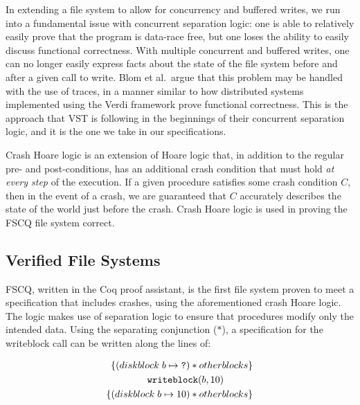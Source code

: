 In extending a file system to allow for concurrency and buffered writes, we run
into a fundamental issue with concurrent separation logic: one is able to
relatively easily prove that the program is data-race free, but one loses the
ability to easily discuss functional correctness.
With multiple concurrent and
buffered writes, one can no longer easily express facts about the state of the
file system before and after a given call to write.
Blom et al.\ argue that
this problem may be handled with the use of traces\cite{blom2015history}, in a
manner similar to how distributed systems implemented using the Verdi framework
prove functional correctness. \cite{wilcox2015verdi}
This is the approach that
VST is following in the beginnings of their concurrent separation logic, and it
is the one we take in our specifications.


Crash Hoare logic\cite{chen2015using} is an extension of Hoare logic that, in
addition to the regular pre- and post-conditions, has an additional crash
condition that must hold \textit{at every step} of the execution.
If a given
procedure satisfies some crash condition $C$, then in the event of a crash, we
are guaranteed that $C$ accurately describes the state of the world just before
the crash.
Crash Hoare logic is used in proving the FSCQ\cite{chen2015using}
file system correct.

\subsection{Verified File Systems}
FSCQ\cite{chen2015using}, written in the Coq proof assistant, is the first file
system proven to meet a specification that includes crashes, using the
aforementioned crash Hoare logic.
The logic makes use of separation logic to
ensure that procedures modify only the intended data.
Using the separating
conjunction ($\ast$), a specification for the writeblock call can be written
along the lines of:

\begin{align*}
    \left\{ (diskblock\;b \mapsto \texttt{?}) \ast otherblocks \right\} \\ 
    \texttt{writeblock}(b, 10)\hspace{30px} \\
    \left\{ (diskblock\;b \mapsto 10) \ast otherblocks \right\}
\end{align*}

